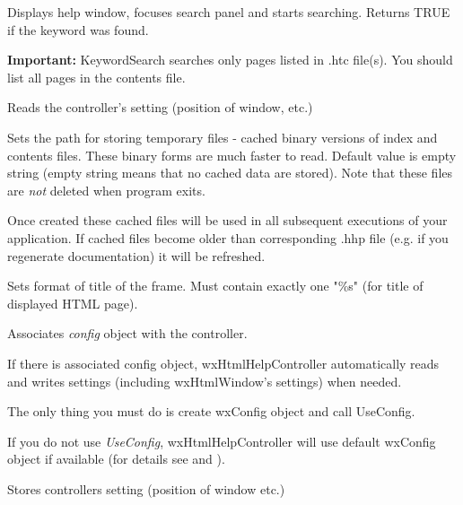 
Displays help window, focuses search panel and starts searching.
Returns TRUE if the keyword was found.

{\bf Important:} KeywordSearch searches only pages listed in .htc file(s).
You should list all pages in the contents file.

\label{wxhtmlhelpcontrollerreadcustomization}


Reads the controller's setting (position of window, etc.)

\label{wxhtmlhelpcontrollersettempdir}


Sets the path for storing temporary files - cached binary versions of index and contents files. These binary
forms are much faster to read. Default value is empty string (empty string means
that no cached data are stored). Note that these files are {\it not} 
deleted when program exits.

Once created these cached files will be used in all subsequent executions 
of your application. If cached files become older than corresponding .hhp
file (e.g. if you regenerate documentation) it will be refreshed.

\label{wxhtmlhelpcontrollersettitleformat}


Sets format of title of the frame. Must contain exactly one "\%s"
(for title of displayed HTML page).

\label{wxhtmlhelpcontrolleruseconfig}


Associates {\it config} object with the controller.

If there is associated config object, wxHtmlHelpController automatically
reads and writes settings (including wxHtmlWindow's settings) when needed.

The only thing you must do is create wxConfig object and call UseConfig.

If you do not use {\it UseConfig}, wxHtmlHelpController will use 
default wxConfig object if available (for details see 
 and 
).

\label{wxhtmlhelpcontrollerwritecustomization}


Stores controllers setting (position of window etc.)

